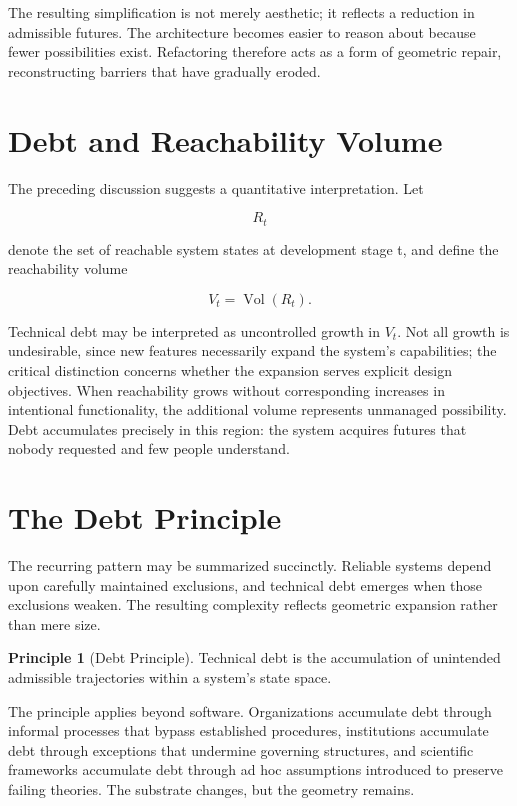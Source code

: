 \documentclass[11pt,oneside]{book}
\theoremstyle{plain}
\theoremstyle{definition}
\newtheorem{principle}[theorem]{Principle}
\theoremstyle{remark}
\DeclareMathOperator{\Vol}{Vol}
\begin{document}
The resulting simplification is not merely aesthetic; it reflects a reduction in admissible futures. The architecture becomes easier to reason about because fewer possibilities exist. Refactoring therefore acts as a form of geometric repair, reconstructing barriers that have gradually eroded.

\section{Debt and Reachability Volume}

The preceding discussion suggests a quantitative interpretation. Let

\begin{equation}
R_t
\end{equation}

denote the set of reachable system states at development stage t, and define the reachability volume

\begin{equation}
V_t
=
\Vol(R_t).
\end{equation}

Technical debt may be interpreted as uncontrolled growth in \(V_t\). Not all growth is undesirable, since new features necessarily expand the system's capabilities; the critical distinction concerns whether the expansion serves explicit design objectives. When reachability grows without corresponding increases in intentional functionality, the additional volume represents unmanaged possibility. Debt accumulates precisely in this region: the system acquires futures that nobody requested and few people understand.

\section{The Debt Principle}

The recurring pattern may be summarized succinctly. Reliable systems depend upon carefully maintained exclusions, and technical debt emerges when those exclusions weaken. The resulting complexity reflects geometric expansion rather than mere size.

\begin{principle}[Debt Principle]
Technical debt is the accumulation of unintended admissible trajectories within a system's state space.
\end{principle}

The principle applies beyond software. Organizations accumulate debt through informal processes that bypass established procedures, institutions accumulate debt through exceptions that undermine governing structures, and scientific frameworks accumulate debt through ad hoc assumptions introduced to preserve failing theories. The substrate changes, but the geometry remains.
\end{document}
